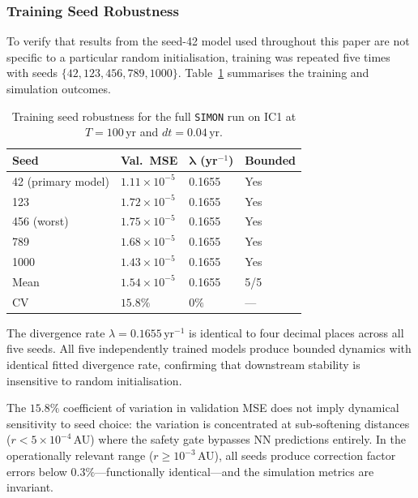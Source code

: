 \documentclass[12pt]{article}
\begin{document}
\subsubsection{Training Seed Robustness}
\label{sec:seed_robustness}

To verify that results from the seed-42 model used throughout this paper are
not specific to a particular random initialisation, training was repeated five times
with seeds $\{42, 123, 456, 789, 1000\}$. Table~\ref{tab:seeds} summarises the
training and simulation outcomes.

\begin{table}[H]
\centering
\caption{Training seed robustness for the full \texttt{SIMON} run on IC1 at $T=100$\,yr and $dt=0.04$\,yr.}
\label{tab:seeds}
\begin{tabular}{@{}llll@{}}
\toprule
\textbf{Seed} & \textbf{Val.\ MSE} & $\boldsymbol{\lambda}$ (yr$^{-1}$) & \textbf{Bounded} \\
\midrule
42 (primary model) & $1.11\times10^{-5}$ & 0.1655 & Yes \\
123                & $1.72\times10^{-5}$ & 0.1655 & Yes \\
456 (worst)        & $1.75\times10^{-5}$ & 0.1655 & Yes \\
789                & $1.68\times10^{-5}$ & 0.1655 & Yes \\
1000               & $1.43\times10^{-5}$ & 0.1655 & Yes \\
\midrule
Mean               & $1.54\times10^{-5}$ & 0.1655 & 5/5 \\
CV                 & $15.8\%$            & $0\%$  & --- \\
\bottomrule
\end{tabular}
\end{table}

The divergence rate $\lambda = 0.1655$\,yr$^{-1}$ is identical to four decimal places across all five seeds. All five independently trained models produce bounded dynamics with identical fitted divergence rate, confirming that downstream stability is insensitive to random initialisation.

The $15.8\%$ coefficient of variation in validation MSE does not imply dynamical
sensitivity to seed choice: the variation is concentrated at sub-softening distances
($r < 5\times10^{-4}$\,AU) where the safety gate bypasses NN predictions entirely.
In the operationally relevant range ($r \geq 10^{-3}$\,AU), all seeds produce
correction factor errors below $0.3\%$---functionally identical---and the simulation
metrics are invariant.
\end{document}
